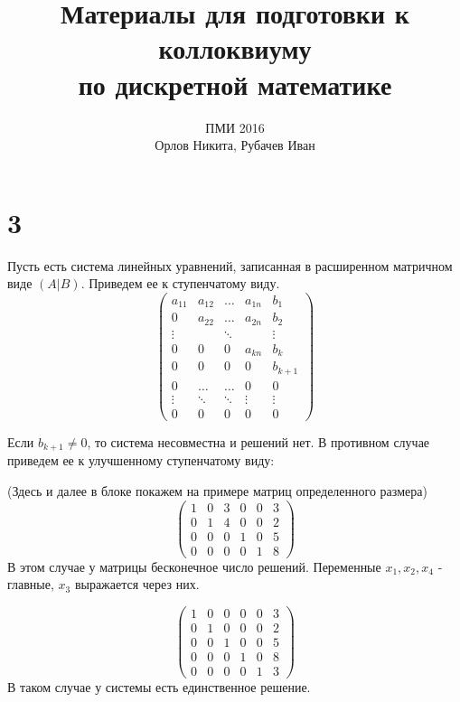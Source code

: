 \documentclass[a4paper,12pt]{article}
\begin{document}
	\title{Материалы для подготовки к коллоквиуму\\ по дискретной математике}
	\author{ПМИ 2016 \\ Орлов Никита, Рубачев Иван}
	\maketitle
	
	\section*{3}
	Пусть есть система линейных уравнений, записанная в расширенном матричном виде $(A|B)$. Приведем ее к ступенчатому виду. 
	\[
	\left(
	\begin{array}{cccc|c}
	a_{11} & a_{12} & \ldots & a_{1n} & b_1 \\
	0      & a_{22} & \ldots & a_{2n} & b_2 \\
	\vdots &        & \ddots &        & \vdots \\
	0      & 0      & 0      & a_{kn} & b_k \\
	0      &  0     & 0      & 0      & b_{k + 1} \\
	0      &  \ldots& \ldots & 0      & 0\\
	\vdots & \ddots & \ddots & \vdots & \vdots\\
	0 & 0 & 0 & 0 & 0
	\end{array}
	\right)
	\]
	
	Если $b_{k+1} \neq 0$, то система несовместна и решений нет. В противном случае приведем ее к улучшенному ступенчатому виду:
	
	(Здесь и далее в блоке покажем на примере матриц определенного размера)
	\[
	\left(
	\begin{array}{ccccc|c}
	1 & 0 & 3 & 0 & 0 & 3 \\
	0 & 1 & 4 & 0 & 0 & 2 \\
	0 & 0 & 0 & 1 & 0 & 5 \\
	0 & 0 & 0 & 0 & 1 & 8
	\end{array}
	\right)
	\]
	В этом случае у матрицы бесконечное число решений. Переменные $x_1, x_2, x_4$ - главные, $x_3$ выражается через них.
	
	\[
	\left(
	\begin{array}{ccccc|c}
	1 & 0 & 0 & 0 & 0 & 3 \\
	0 & 1 & 0 & 0 & 0 & 2 \\
	0 & 0 & 1 & 0 & 0 & 5 \\
	0 & 0 & 0 & 1 & 0 & 8 \\
	0 & 0 & 0 & 0 & 1 & 3 
	\end{array}
	\right)
	\]
	В таком случае у системы есть единственное решение.
	
\end{document}
